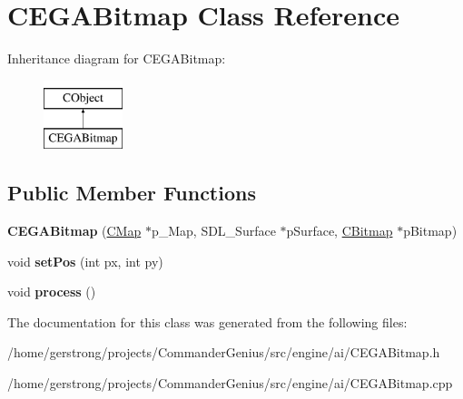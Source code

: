 \hypertarget{class_c_e_g_a_bitmap}{
\section{CEGABitmap Class Reference}
\label{class_c_e_g_a_bitmap}
}
Inheritance diagram for CEGABitmap:\begin{figure}[H]
\begin{center}
\leavevmode
\includegraphics[height=2cm]{class_c_e_g_a_bitmap}
\end{center}
\end{figure}
\subsection*{Public Member Functions}
\begin{DoxyCompactItemize}
\item 
\hypertarget{class_c_e_g_a_bitmap_a8de447836bb9abfc485ebcbb0d98c98a}{
{\bfseries CEGABitmap} (\hyperlink{class_c_map}{CMap} $\ast$p\_\-Map, SDL\_\-Surface $\ast$pSurface, \hyperlink{class_c_bitmap}{CBitmap} $\ast$pBitmap)}
\label{class_c_e_g_a_bitmap_a8de447836bb9abfc485ebcbb0d98c98a}

\item 
\hypertarget{class_c_e_g_a_bitmap_ad47973db39ebc7d8d8418dea378644cc}{
void {\bfseries setPos} (int px, int py)}
\label{class_c_e_g_a_bitmap_ad47973db39ebc7d8d8418dea378644cc}

\item 
\hypertarget{class_c_e_g_a_bitmap_a4545d1cf13402732d8dad44c9ecc0220}{
void {\bfseries process} ()}
\label{class_c_e_g_a_bitmap_a4545d1cf13402732d8dad44c9ecc0220}

\end{DoxyCompactItemize}


The documentation for this class was generated from the following files:\begin{DoxyCompactItemize}
\item 
/home/gerstrong/projects/CommanderGenius/src/engine/ai/CEGABitmap.h\item 
/home/gerstrong/projects/CommanderGenius/src/engine/ai/CEGABitmap.cpp\end{DoxyCompactItemize}
